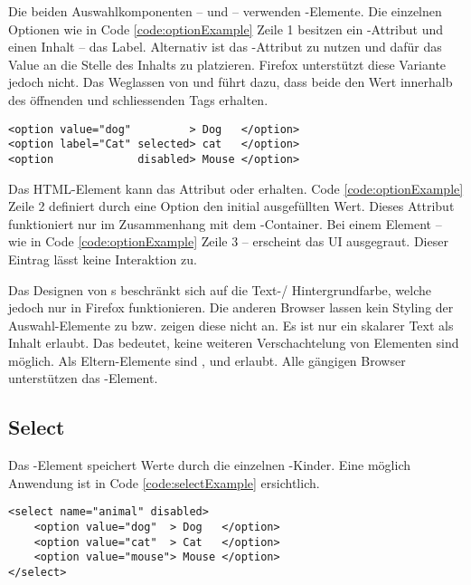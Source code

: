 Die beiden Auswahlkomponenten –  und  – verwenden -Elemente. 
Die einzelnen Optionen wie in Code \ref{code:optionExample} Zeile 1 besitzen ein -Attribut und einen Inhalt – das Label. 
Alternativ ist das -Attribut zu nutzen und dafür das Value an die Stelle des Inhalts zu platzieren. 
Firefox unterstützt diese Variante jedoch nicht. 
Das Weglassen von  und  führt dazu, dass beide den Wert innerhalb des öffnenden und schliessenden Tags erhalten. 

\begin{lstlisting}[style = htmlcssjs, caption = Option Beispiel, label = code:optionExample]
<option value="dog"         > Dog   </option>
<option label="Cat" selected> cat   </option>
<option             disabled> Mouse </option>
\end{lstlisting} 

Das HTML-Element kann das Attribut  oder  erhalten. 
Code \ref{code:optionExample} Zeile 2 definiert durch eine  Option den initial ausgefüllten Wert. 
Dieses Attribut funktioniert nur im Zusammenhang mit dem -Container.
Bei einem  Element – wie in Code \ref{code:optionExample} Zeile 3 – erscheint das UI ausgegraut. 
Dieser Eintrag lässt keine Interaktion zu. 

Das Designen von s beschränkt sich auf die Text-/ Hintergrundfarbe, welche jedoch nur in Firefox funktionieren. 
Die anderen Browser lassen kein Styling der Auswahl-Elemente zu bzw. zeigen diese nicht an. 
Es ist nur ein skalarer Text als Inhalt erlaubt. 
Das bedeutet, keine weiteren Verschachtelung von Elementen sind möglich. 
Als Eltern-Elemente sind ,  und  erlaubt. 
Alle gängigen Browser unterstützen das -Element. 


\subsection{Select}
\label{sec:select}

Das -Element speichert Werte durch die einzelnen -Kinder. 
Eine möglich Anwendung ist in Code \ref{code:selectExample} ersichtlich. 

\begin{lstlisting}[style = htmlcssjs, caption = Disabled Select Beispiel, label = code:selectExample]
<select name="animal" disabled>
    <option value="dog"  > Dog   </option>
    <option value="cat"  > Cat   </option>
    <option value="mouse"> Mouse </option>
</select>
\end{lstlisting}

